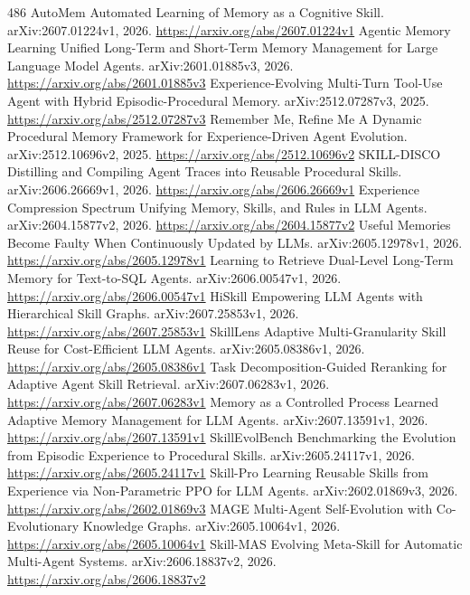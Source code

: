 \documentclass[11pt]{article}
\begin{document}
\begin{thebibliography}{486}
 AutoMem Automated Learning of Memory as a Cognitive Skill. arXiv:2607.01224v1, 2026. \url{https://arxiv.org/abs/2607.01224v1}
 Agentic Memory Learning Unified Long-Term and Short-Term Memory Management for Large Language Model Agents. arXiv:2601.01885v3, 2026. \url{https://arxiv.org/abs/2601.01885v3}
 Experience-Evolving Multi-Turn Tool-Use Agent with Hybrid Episodic-Procedural Memory. arXiv:2512.07287v3, 2025. \url{https://arxiv.org/abs/2512.07287v3}
 Remember Me, Refine Me A Dynamic Procedural Memory Framework for Experience-Driven Agent Evolution. arXiv:2512.10696v2, 2025. \url{https://arxiv.org/abs/2512.10696v2}
 SKILL-DISCO Distilling and Compiling Agent Traces into Reusable Procedural Skills. arXiv:2606.26669v1, 2026. \url{https://arxiv.org/abs/2606.26669v1}
 Experience Compression Spectrum Unifying Memory, Skills, and Rules in LLM Agents. arXiv:2604.15877v2, 2026. \url{https://arxiv.org/abs/2604.15877v2}
 Useful Memories Become Faulty When Continuously Updated by LLMs. arXiv:2605.12978v1, 2026. \url{https://arxiv.org/abs/2605.12978v1}
 Learning to Retrieve Dual-Level Long-Term Memory for Text-to-SQL Agents. arXiv:2606.00547v1, 2026. \url{https://arxiv.org/abs/2606.00547v1}
 HiSkill Empowering LLM Agents with Hierarchical Skill Graphs. arXiv:2607.25853v1, 2026. \url{https://arxiv.org/abs/2607.25853v1}
 SkillLens Adaptive Multi-Granularity Skill Reuse for Cost-Efficient LLM Agents. arXiv:2605.08386v1, 2026. \url{https://arxiv.org/abs/2605.08386v1}
 Task Decomposition-Guided Reranking for Adaptive Agent Skill Retrieval. arXiv:2607.06283v1, 2026. \url{https://arxiv.org/abs/2607.06283v1}
 Memory as a Controlled Process Learned Adaptive Memory Management for LLM Agents. arXiv:2607.13591v1, 2026. \url{https://arxiv.org/abs/2607.13591v1}
 SkillEvolBench Benchmarking the Evolution from Episodic Experience to Procedural Skills. arXiv:2605.24117v1, 2026. \url{https://arxiv.org/abs/2605.24117v1}
 Skill-Pro Learning Reusable Skills from Experience via Non-Parametric PPO for LLM Agents. arXiv:2602.01869v3, 2026. \url{https://arxiv.org/abs/2602.01869v3}
 MAGE Multi-Agent Self-Evolution with Co-Evolutionary Knowledge Graphs. arXiv:2605.10064v1, 2026. \url{https://arxiv.org/abs/2605.10064v1}
 Skill-MAS Evolving Meta-Skill for Automatic Multi-Agent Systems. arXiv:2606.18837v2, 2026. \url{https://arxiv.org/abs/2606.18837v2}

\end{thebibliography}
\end{document}

